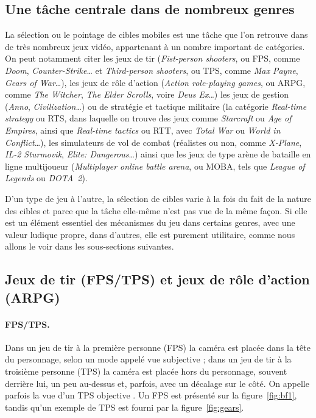 	\subsection{Une tâche centrale dans de nombreux genres}
	La sélection ou le pointage de cibles mobiles est une tâche que l'on retrouve dans de très nombreux jeux vidéo, appartenant à un nombre important de catégories. On peut notamment citer les jeux de tir (\emph{Fist-person shooters}, ou FPS, comme \emph{Doom}, \emph{Counter-Strike}\ldots{} et \emph{Third-person shooters}, ou TPS, comme \emph{Max Payne}, \emph{Gears of War}\ldots{}), les jeux de rôle d'action (\emph{Action role-playing games}, ou ARPG, comme \emph{The Witcher}, \emph{The Elder Scrolls}, voire \emph{Deus Ex}\ldots{}) les jeux de gestion (\emph{Anno}, \emph{Civilization}\ldots{}) ou de stratégie et tactique militaire (la catégorie \emph{Real-time strategy} ou RTS, dans laquelle on trouve des jeux comme \emph{Starcraft} ou \emph{Age of Empires}, ainsi que \emph{Real-time tactics} ou RTT, avec \emph{Total War} ou \emph{World in Conflict}\ldots{}), les simulateurs de vol de combat (réalistes ou non, comme \emph{X-Plane}, \emph{IL-2 Sturmovik}, \emph{Elite: Dangerous}\ldots{}) ainsi que les jeux de type arène de bataille en ligne multijoueur (\emph{Multiplayer online battle arena}, ou MOBA, tels que \emph{League of Legends} ou \emph{DOTA~2}).
	
	D'un type de jeu à l'autre, la sélection de cibles varie à la fois du fait de la nature des cibles et parce que la tâche elle-même n'est pas vue de la même façon. Si elle est un élément essentiel des mécanismes du jeu dans certains genres, avec une valeur ludique propre, dans d'autres, elle est purement utilitaire, comme nous allons le voir dans les sous-sections suivantes.
	
	\subsection{Jeux de tir (FPS/TPS) et jeux de rôle d'action (ARPG)}
	\paragraph{FPS/TPS.}
	Dans un jeu de tir à la première personne (FPS) la caméra est placée \og dans la tête \fg{} du personnage, selon un mode appelé \og vue subjective \fg{} ; dans un jeu de tir à la troisième personne (TPS) la caméra est placée hors du personnage, souvent derrière lui, un peu au-dessus et, parfois, avec un décalage sur le côté. On appelle parfois la vue d'un TPS \og objective \fg{}. Un FPS est présenté sur la figure~\ref{fig:bf1}, tandis qu'un exemple de TPS est fourni par la figure~\ref{fig:gears}.
	
